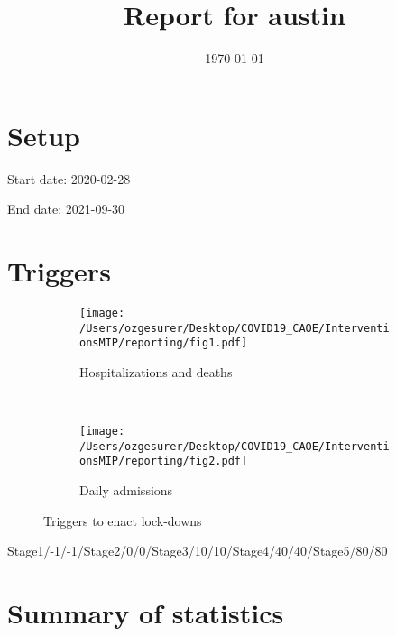 \documentclass{article}
\title{Report for austin}
\author{}
\date{\today}
\begin{document}
\maketitle

\section*{Setup}

Start date: 2020-02-28

End date: 2021-09-30 




\section*{Triggers}
\begin{figure}[!htb]
  \centering
  \setlength{\unitlength}{1cm}
    \begin{subfigure}[b]{0.475\linewidth}
    \centering
        \texttt{[image: /Users/ozgesurer/Desktop/COVID19\_CAOE/InterventionsMIP/reporting/fig1.pdf]}
        \caption{Hospitalizations  and deaths}
        \label{fig:IHD}
    \end{subfigure}
    ~
    \begin{subfigure}[b]{0.475\linewidth}
    \centering
         \texttt{[image: /Users/ozgesurer/Desktop/COVID19\_CAOE/InterventionsMIP/reporting/fig2.pdf]}
        \caption{Daily admissions}
        \label{fig:IYIH}
    \end{subfigure}
    \caption{Triggers to enact lock-downs}\label{fig:SD90}
\end{figure}

Stage1/-1/-1/Stage2/0/0/Stage3/10/10/Stage4/40/40/Stage5/80/80

\newpage

\section*{Summary of statistics}
\end{document}
